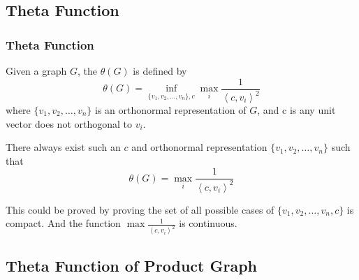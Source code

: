 \subsection{Theta Function}

      \begin{frame}
            \frametitle{Theta Function}
            Given a graph $ G $, the $ \theta(G) $ is defined by
            \begin{equation}
                  \theta(G) = \inf_{\{v_1, v_2, \dots, v_n\},c} \max_{i} \frac{1}{\left<c,v_{i}\right>^2}
            \end{equation}
            where $ \{v_1, v_2, \dots, v_n\} $ is an orthonormal representation of $ G $, and c is any unit vector does not orthogonal to $ v_i $.

            \pause

            \begin{lemma}
                  There always exist such an $c$ and orthonormal representation $ \{v_1, v_2, \dots, v_n\} $ such that
                  \begin{equation}
                        \theta(G) = \max_{i} \frac{1}{\left<c,v_{i}\right>^2}
                  \end{equation}
            \end{lemma}

            This could be proved by proving the set of all possible cases of $ \{v_1, v_2, \dots, v_n,c \} $ is compact. And the function $ \max \frac{1}{\left<c,v_{i}\right>^2} $ is continuous.
      \end{frame}

\subsection{Theta Function of Product Graph}

